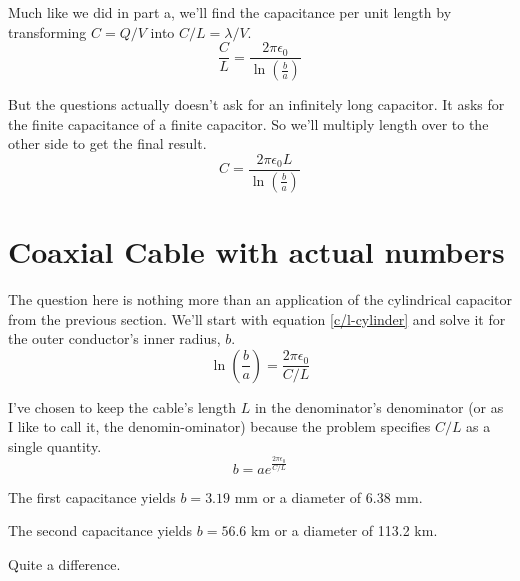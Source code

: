 \documentclass[10pt,a4paper]{article}
\begin{document}
Much like we did in part a, we'll find the capacitance per unit length by transforming $C=Q/V$ into $C/L=\lambda/V$.
\begin{equation}\label{c/l-cylinder}
\frac{C}{L}=\frac{2\pi \epsilon_0}{\ln\left(\frac{b}{a}\right)}
\end{equation}

But the questions actually doesn't ask for an infinitely long capacitor. It asks for the finite capacitance of a finite capacitor. So we'll multiply length over to the other side to get the final result.
\begin{equation}\boxed{
C=\frac{2\pi \epsilon_0 L}{\ln\left(\frac{b}{a}\right)}
}\end{equation}

\section{Coaxial Cable with actual numbers}
The question here is nothing more than an application of the cylindrical capacitor from the previous section. We'll start with equation \ref{c/l-cylinder} and solve it for the outer conductor's inner radius, $b$.
\begin{equation}
\ln\left(\frac{b}{a}\right)=\frac{2\pi\epsilon_0}{C/L}
\end{equation}

I've chosen to keep the cable's length $L$ in the denominator's denominator (or as I like to call it, the denomin-ominator) because the problem specifies $C/L$ as a single quantity.
\begin{equation}\boxed{
b=ae^{\frac{2\pi\epsilon_0}{C/L}}
}\end{equation}

The first capacitance yields $b=3.19$ mm or a diameter of 6.38 mm.

The second capacitance yields $b=56.6$ km or a diameter of 113.2 km.

Quite a difference.
\end{document}
